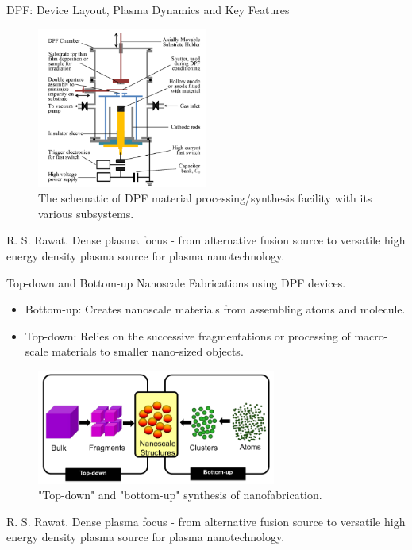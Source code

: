 \begin{frame} {DPF: Device Layout, Plasma Dynamics and Key Features}
    \begin{figure}
        \centering
        \includegraphics[width=0.5\textwidth]{figures/dpf-device-layout.png}
        \caption{The schematic of DPF material processing/synthesis facility with its various subsystems. \cite{rawat_2015_dense}}
        \label{fig:dpf-device-layout}
    \end{figure}
    \tiny{\cite{rawat_2015_dense} R. S. Rawat. Dense plasma focus - from alternative fusion source to versatile high energy density plasma source for plasma nanotechnology.}
\end{frame}

\begin{frame} {Top-down and Bottom-up Nanoscale Fabrications using DPF devices.}
    \begin{itemize}
        \item Bottom-up: Creates nanoscale materials from assembling atoms and molecule.
        \item Top-down: Relies on the successive fragmentations or processing of macro-scale materials to smaller nano-sized objects.
    \end{itemize}
    \begin{figure}
        \centering
        \includegraphics[width=0.7\textwidth]{figures/top-down-vs-bottom-up.png}
        \caption{"Top-down" and "bottom-up" synthesis of nanofabrication.}
        \label{fig:top-down-vs-bottom-up}
    \end{figure}
    \tiny{\cite{rawat_2015_dense} R. S. Rawat. Dense plasma focus - from alternative fusion source to versatile high energy density plasma source for plasma nanotechnology.}
\end{frame}

